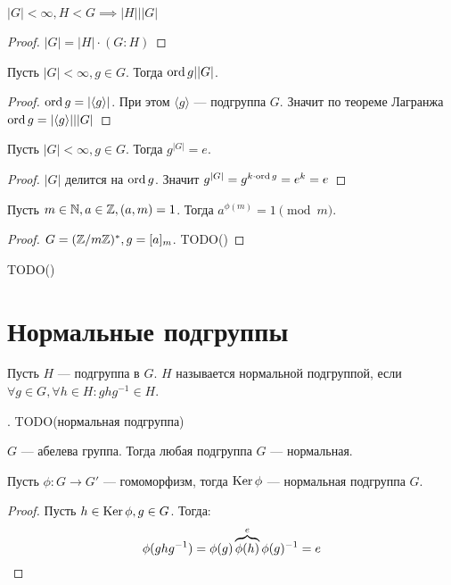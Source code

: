 \documentclass[../main.tex]{subfiles}
\begin{document}
\begin{theorem}[Лагранжа]
    $|G| < \infty, H < G \implies |H| | |G|$
\end{theorem}
\begin{proof}
    $|G| = |H| \cdot (G : H)$
\end{proof}
\begin{corollary}
    Пусть $|G| < \infty, g \in G$. Тогда $\operatorname{ord} g | |G|$.
\end{corollary}
\begin{proof}
    $\operatorname{ord} g = |\langle g \rangle|$. При этом $\langle g \rangle$ --- подгруппа $G$. Значит по теореме Лагранжа $\operatorname{ord} g = |\langle g \rangle| | |G|$
\end{proof}
\begin{corollary}
    Пусть $|G| < \infty, g \in G$. Тогда $g^{|G|} = e$.
\end{corollary}
\begin{proof}
    $|G|$ делится на $\operatorname{ord} g$. Значит $g^{|G|} = g^{k \cdot \operatorname{ord} g} = e^k = e$
\end{proof}
\begin{corollary}
    Пусть $m \in \mathbb{N}, a \in \mathbb{Z}, (a, m) = 1$. Тогда $a^{\phi(m)} = 1 \pmod{m}$.
\end{corollary}
\begin{proof}
    $G = (\mathbb{Z} /m \mathbb{Z})^{*}, g = [a]_{m}$. TODO()
\end{proof}

TODO()

\section{Нормальные подгруппы}
\begin{definition}
    Пусть $H$ --- подгруппа в $G$. $H$ называется нормальной подгруппой, если $\forall g \in G, \forall h \in H\colon ghg^{-1} \in H$.
\end{definition}
. TODO(нормальная подгруппа)
\begin{remark}
    $G$ --- абелева группа. Тогда любая подгруппа $G$ --- нормальная.
\end{remark}

\begin{theorem-non}
    Пусть $\phi\colon G \to G'$ --- гомоморфизм, тогда $\operatorname{Ker} \phi$ --- нормальная подгруппа $G$.
\end{theorem-non}
\begin{proof}
    Пусть $h \in \operatorname{Ker} \phi, g \in G$. Тогда:
    \begin{equation*}
        \phi(ghg^{-1}) = \phi(g) \overbrace{\phi(h)}^{\mathclap{e}} \phi(g)^{-1} = e
    \end{equation*}
\end{proof}
\end{document}
